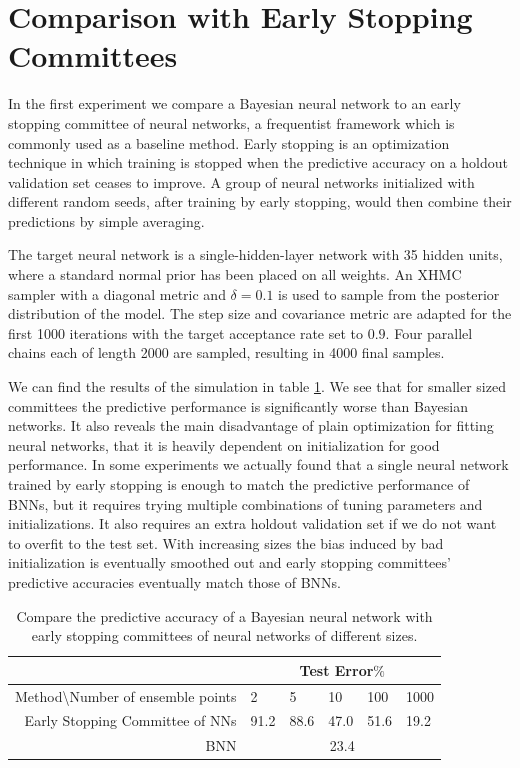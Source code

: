 \documentclass[12pt]{report}
\begin{document}
\section{Comparison with Early Stopping Committees}

In the first experiment we compare a Bayesian neural network to an early stopping committee of neural networks, a frequentist framework which is commonly used as a baseline method. Early stopping is an optimization technique in which training is stopped when the predictive accuracy on a holdout validation set ceases to improve. A group of neural networks initialized with different random seeds, after training by early stopping,  would then combine their predictions by simple averaging. 


The target neural network is a single-hidden-layer network with 35 hidden units, where a standard normal prior has been placed on all weights. An XHMC sampler with a diagonal metric and $\delta = 0.1$ is used to sample from the posterior distribution of the model. The step size and covariance metric are adapted for the first 1000 iterations with the target acceptance rate set to $0.9$. Four parallel chains each of length 2000 are sampled, resulting in 4000 final samples.

We can find the results of the simulation in table \ref{esc}. We see that for smaller sized committees the predictive performance is significantly worse than Bayesian networks. It also reveals the main disadvantage of plain optimization for fitting neural networks, that it is heavily dependent on initialization for good performance. In some experiments we actually found that a single neural network trained by early stopping is enough to match the predictive performance of BNNs, but it requires trying multiple combinations of tuning parameters and initializations. It also requires an extra holdout validation set if we do not want to overfit to the test set. With increasing sizes the bias induced by bad initialization is eventually smoothed out and early stopping committees' predictive accuracies eventually match those of BNNs. 

\begin{table}[]
\centering
\begin{tabular}{@{}rlllll@{}}
\multicolumn{1}{l}{}                            & \multicolumn{5}{c}{Test Error$\%$} \\ \midrule
Method\textbackslash{}Number of ensemble points & 2    & 5   & 10  & 100 & 1000 \\ \midrule
Early Stopping Committee of NNs                 & 91.2  & 88.6 & 47.0 & 51.6 & 19.2  \\ \midrule
BNN                                             & \multicolumn{5}{c}{23.4}        \\ \bottomrule
\end{tabular}
\caption{Compare the predictive accuracy of a Bayesian neural network with early stopping committees of neural networks of different sizes.}
\label{esc}
\end{table}
\end{document}
